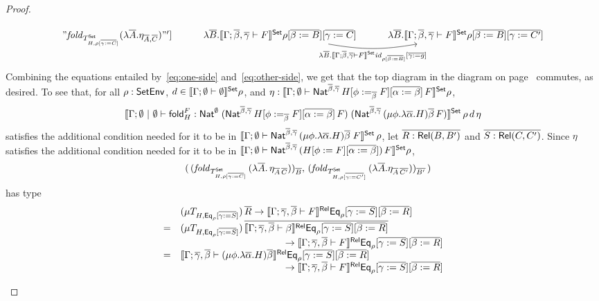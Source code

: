 \documentclass[runningheads]{llncs}
\newcommand{\set}{\mathsf{Set}}
\renewcommand{\id}{\mathit{id}}
\newcommand{\fold}{\mathsf{fold}}
\renewcommand{\id}{\mathit{id}}
\begin{document}
\begin{proof}
\begin{itemize}
{\begin{equation}
\begin{tikzcd}[row sep = huge]
  "{\mathit{fold}_{T^{\set}_{H,\rho [\ol{\gamma := C}]}} (\lambda
    \ol{A}. \eta_{\ol{A}, \ol{C}})}"'] & \lambda \ol{B}.\setsem{\Gamma; \ol{\beta},
  \ol{\gamma} \vdash F} \rho [\ol{\beta := B}] [\ol{\gamma := C}]
\ar[r, bend right = 10, "{\lambda \ol{B}.\setsem{\Gamma; \ol{\beta}, \ol{\gamma}
      \vdash F} \id_{\rho [\ol{\beta := B}]} [\ol{\gamma := g}]}"'] &
\lambda \ol{B}.\setsem{\Gamma; \ol{\beta}, \ol{\gamma} \vdash F} \rho [\ol{\beta :=
    B}] [\ol{\gamma := C'}]
\end{tikzcd}
\end{equation}}
Combining the equations entailed by~\ref{eq:one-side}
and~\ref{eq:other-side}, we get that
the top diagram in the diagram on
  page~\pageref{page:dia1} commutes, as desired.
To see that, for all $\rho : \mathsf{SetEnv}$, $d \in
\setsem{\Gamma; \emptyset \vdash \emptyset}\rho$, and $\eta :
\setsem{\Gamma; \emptyset \vdash \Nat^{\ol{\beta},
    \ol{\gamma}}\,H[\phi :=_{\ol{\beta}} F][\ol{\alpha := \beta}]\,F}
\rho$,
\[\setsem{\Gamma; \emptyset~|~\emptyset
  \vdash \fold^F_H : \Nat^\emptyset\;(\Nat^{\ol{\beta},
    \ol{\gamma}}\,H[\phi :=_{\ol{\beta}} F][\ol{\alpha :=
      \beta}]\,F)\; (\Nat^{{\ol{\beta},\ol{\gamma}} }\,(\mu
  \phi.\lambda \overline \alpha.H)\overline \beta\,F)}\,\rho\,d\,\eta\]
satisfies the additional condition needed for it to be in
$\setsem{\Gamma;\emptyset \vdash \Nat^{{\ol{\beta},\ol{\gamma}}
  }\,(\mu \phi.\lambda \overline \alpha.H)\overline \beta\;F}\,\rho$,
let $\overline{R : \mathsf{Rel}(B,B')}$ and $\overline{S : \mathsf{Rel}(C,C')}$.  Since $\eta$
satisfies the additional condition needed for it to be in
$\setsem{\Gamma; \emptyset \vdash \Nat^{\ol{\beta},
    \ol{\gamma}}\,(H[\phi := F][\ol{\alpha := \beta}])\,F} \rho$,
\[\begin{array}{ll}
 & (\,(\mathit{fold}_{T^\set_{H,\rho[\ol{\gamma :=
        C}]}}\,(\lambda \ol{A}.\,\eta_{\ol{A}\,\ol{C}}))_{\ol{B}},\,
(\mathit{fold}_{T^\set_{H,\rho[\ol{\gamma :=
        C'}]}}\,(\lambda \ol{A}.\eta_{\ol{A}\,\ol{C'}}))_{\ol{B'}}\,) 
\end{array}\]
has type
\[\begin{array}{ll}
  & (\mu T_{H,\mathsf{Eq}_\rho[\overline{\gamma := S}]}) \,\overline{R} \to
\llbracket{\Gamma;\overline{\gamma},\overline{\beta} \vdash F}\rrbracket^{\mathsf{Rel}}\mathsf{Eq}_\rho[\overline{\gamma := 
    S}][\overline{\beta:= R}]\\ 
= & (\mu T_{H,\mathsf{Eq}_\rho[\overline{\gamma :=
      S}]})\,\overline{\llbracket{\Gamma;\overline{\gamma},\overline{\beta} 
  \vdash \beta}\rrbracket^{\mathsf{Rel}}\mathsf{Eq}_\rho[\overline{\gamma := S}][\overline{\beta := R}]} \\ 
  &\hspace{1.5in} \to
\llbracket{\Gamma;\overline{\gamma},\overline{\beta} \vdash F}\rrbracket^{\mathsf{Rel}}\mathsf{Eq}_\rho[\overline{\gamma := 
    S}][\overline{\beta:= R}]\\ 
= & \llbracket{\Gamma; \overline{\gamma},\overline{\beta} \vdash (\mu \phi. \lambda
  \overline{\alpha}. H)\overline{\beta}}\rrbracket^{\mathsf{Rel}}\mathsf{Eq}_\rho[\overline{\gamma := S}][\overline{\beta := R}] \\ 
  &\hspace{1.5in}\to
\llbracket{\Gamma;\overline{\gamma},\overline{\beta} \vdash F}\rrbracket^{\mathsf{Rel}}\mathsf{Eq}_\rho[\overline{\gamma := 
    S}][\overline{\beta:= R}]
\end{array}\]
\end{itemize}
\end{proof}
\end{document}
